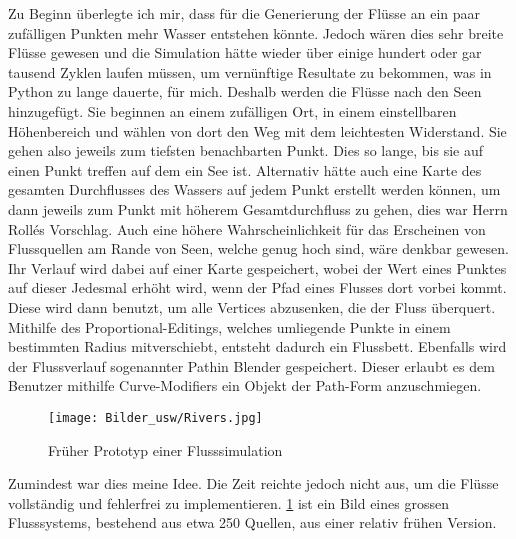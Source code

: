\documentclass[12pt,twoside]{book}
\begin{document}
Zu Beginn \"uberlegte ich mir, dass f\"ur die Generierung der Fl\"usse an ein paar zuf\"alligen Punkten mehr Wasser entstehen k\"onnte. Jedoch w\"aren dies sehr breite Fl\"usse gewesen und die Simulation h\"atte wieder \"uber einige hundert oder gar tausend Zyklen laufen m\"ussen, um vern\"unftige Resultate zu bekommen, was in Python zu lange dauerte, f\"ur mich.
Deshalb werden die Fl\"usse nach den Seen hinzugef\"ugt. Sie beginnen an einem zuf\"alligen Ort, in einem einstellbaren H\"ohenbereich und w\"ahlen von dort den Weg mit dem leichtesten Widerstand. Sie gehen also jeweils zum tiefsten benachbarten Punkt. Dies so lange, bis sie auf einen Punkt treffen auf dem ein See ist.
Alternativ h\"atte auch eine Karte des gesamten Durchflusses des Wassers auf jedem Punkt erstellt werden k\"onnen, um dann jeweils zum Punkt mit h\"oherem Gesamtdurchfluss zu gehen, dies war Herrn Rollés Vorschlag.
Auch eine h\"ohere Wahrscheinlichkeit f\"ur das Erscheinen von Flussquellen am Rande von Seen, welche genug hoch sind, w\"are denkbar gewesen.
\\
Ihr Verlauf wird dabei auf einer Karte gespeichert, wobei der Wert eines Punktes auf dieser Jedesmal erh\"oht wird, wenn der Pfad eines Flusses dort vorbei kommt.
Diese wird dann benutzt, um alle Vertices abzusenken, die der Fluss \"uberquert. Mithilfe des \glqq Proportional\grqq-Editings, welches umliegende Punkte in einem bestimmten Radius \glqq mitverschiebt\grqq, entsteht dadurch ein Flussbett.
Ebenfalls wird der Flussverlauf sogenannter  \glqq Path\grqq{ }in Blender gespeichert. Dieser erlaubt es dem Benutzer mithilfe  \glqq Curve\grqq-Modifiers ein Objekt der Path-Form anzuschmiegen.

\begin{figure}[H]
\texttt{[image: Bilder\_usw/Rivers.jpg]}
\centering
 \caption{Fr\"uher Prototyp einer Flusssimulation}
  \label{fig:River}
\centering
\end{figure}

Zumindest war dies meine Idee. Die Zeit reichte jedoch nicht aus, um die Fl\"usse vollst\"andig und fehlerfrei zu implementieren. \ref{fig:River} ist ein Bild eines grossen Flusssystems, bestehend aus etwa 250 Quellen, aus einer relativ fr\"uhen Version.
\end{document}
